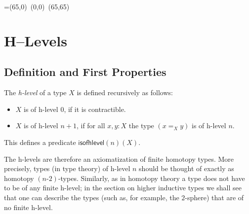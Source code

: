 


\newbox\pbbox
\setbox\pbbox=\hbox{\xy \POS(65,0)\ar@{-} (0,0) \ar@{-} (65,65)\endxy}
\def\pb{\save[]+<3.5mm,-3.5mm>*{\copy\pbbox} \restore}


\newcommand{\comp}[2]{\ensuremath{{#2} \circ {#1}}}

%
\newcommand{\contr}{\ensuremath{\mathsf{contr}}}
\newcommand{\iscontr}{\ensuremath{\mathsf{iscontr}}}
 \newcommand{\HLevel}{\mathsf{HLevel}}
 \newcommand{\hProp}{\mathsf{hProp}}
 \newcommand{\ishProp}{\mathsf{ishProp}}
 \newcommand{\isofhlevel}{\mathsf{isofhlevel}}
 \newcommand{\isweq}{\mathsf{isweq}}
 \newcommand{\Nat}{\mathsf{Nat}}
 \newcommand{\Type}{\mathsf{Type}}






\chapter{H--Levels}

\section{Definition and First Properties}

\begin{defn}
 The {\em h-level} of a type $X$ is defined recursively as follows:
 \begin{itemize}
  \item $X$ is of h-level $0$, if it is contractible.
  \item $X$ is of h-level $n+1$, if for all $x, y : X$ the type $(x =_X y)$ is of h-level $n$.
 \end{itemize}
 This defines a predicate $\isofhlevel(n)(X)$.
\end{defn}

The h-levels are therefore an axiomatization of finite homotopy types.
More precisely, types (in type theory) of h-level $n$ should be thought of exactly as homotopy $(n\mbox{-}2)$-types.
Similarly, as in homotopy theory a type does not have to be of any finite h-level;
in the section on higher inductive types we shall see that one can describe the types (such as, for example, the $2$-sphere)
that are of no finite h-level.

